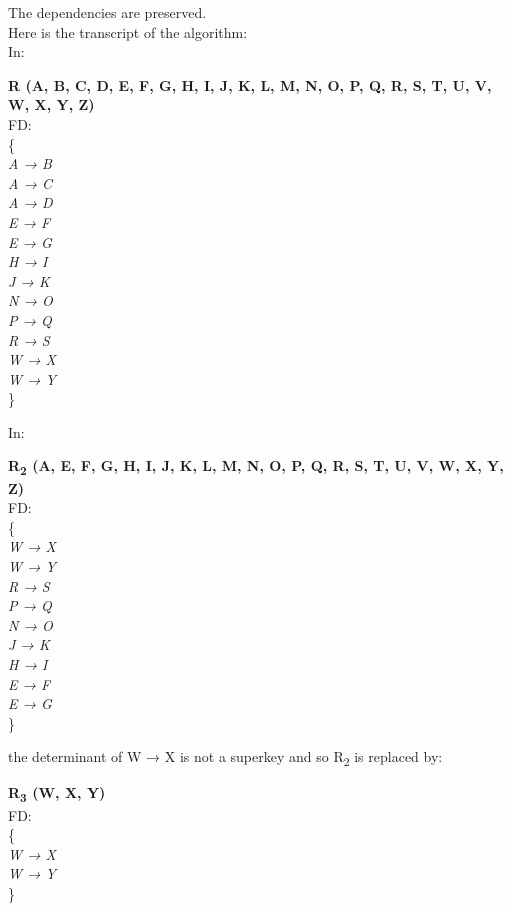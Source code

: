 The dependencies are preserved.\\

Here is the transcript of the algorithm:\\

In:\\

\begin{adjustwidth}{2cm}{}
\textbf{R (A, B, C, D, E, F, G, H, I, J, K, L, M, N, O, P, Q, R, S, T, U, V, W, X, Y, Z)}\\
FD: \\
\{ \\
\textit{
A → B\\
A → C\\
A → D\\
E → F\\
E → G\\
H → I\\
J → K\\
N → O\\
P → Q\\
R → S\\
W → X\\
W → Y\\
}
\}\\
\end{adjustwidth}
 


In:\\

\begin{adjustwidth}{2cm}{}
\textbf{R\textsubscript{2} (A, E, F, G, H, I, J, K, L, M, N, O, P, Q, R, S, T, U, V, W, X, Y, Z)}\\
FD:\\
\{ \\
\textit{  
W → X\\
W → Y\\
R → S\\
P → Q\\
N → O\\
J → K\\
H → I\\
E → F\\
E → G\\
}
\}\\
\end{adjustwidth} 

the determinant of W → X is not a superkey and so R\textsubscript{2} is replaced by:

\begin{adjustwidth}{2cm}{}
\textbf{R\textsubscript{3} (W, X, Y)}\\
FD:\\
\{\\
\textit{ 
W → X\\
W → Y\\ 
}
\} \\
\end{adjustwidth} 

